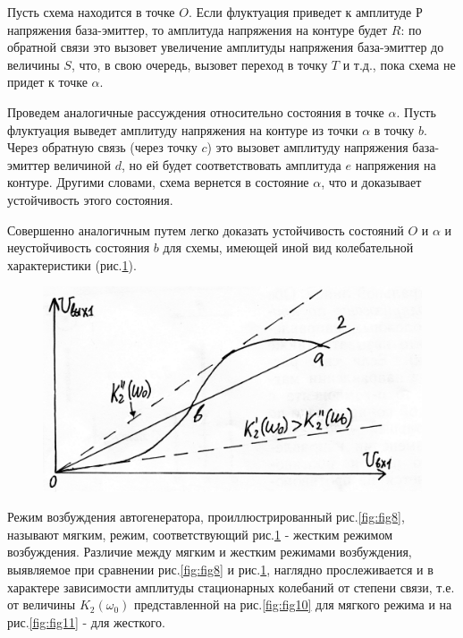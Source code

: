 Пусть схема находится в точке $O$. Если флуктуация приведет к амплитуде $Р$ напряжения база-эмиттер, то амплитуда напряжения на контуре будет $R$: по обратной связи это вызовет увеличение амплитуды напряжения база-эмиттер до величины $S$, что, в свою очередь, вызовет переход в точку $T$ и т.д., пока схема не придет к точке $\alpha$.

Проведем аналогичные рассуждения относительно состояния в точке $\alpha$. Пусть флуктуация выведет амплитуду напряжения на контуре из точки $\alpha$ в точку $b$. Через обратную связь (через точку $c$) это вызовет амплитуду напряжения база-эмиттер величиной $d$, но ей будет соответствовать амплитуда $e$ напряжения на контуре. Другими словами, схема вернется в состояние $\alpha$, что и доказывает устойчивость этого состояния.

Совершенно аналогичным путем легко доказать устойчивость состояний $O$ и $\alpha$ и неустойчивость состояния $b$ для схемы, имеющей иной вид колебательной характеристики (рис.\ref{fig:fig9}).

\begin{figure}[h]
	\centering
	\includegraphics[width=0.4\linewidth]{circuit/fig9}
	\caption{}
	\label{fig:fig9}
\end{figure}

Режим возбуждения автогенератора, проиллюстрированный рис.\ref{fig:fig8}, называют мягким, режим, соответствующий рис.\ref{fig:fig9} - жестким режимом возбуждения. Различие между мягким и жестким режимами возбуждения, выявляемое при сравнении рис.\ref{fig:fig8} и рис.\ref{fig:fig9}, наглядно прослеживается и в характере зависимости амплитуды стационарных колебаний от степени связи, т.е. от величины $K_2(\omega_0)$ представленной на рис.\ref{fig:fig10} для мягкого режима и на рис.\ref{fig:fig11} - для жесткого.


